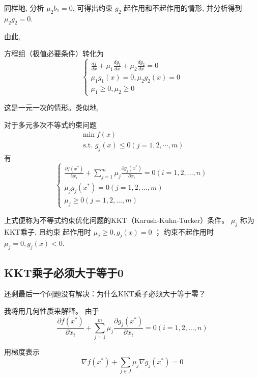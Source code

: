 同样地, 分析 $\mu_{2} b_{1}=0$, 可得出约束 $g_{2}$ 起作用和不起作用的情形, 并分析得到 $\mu_{2} g_{2}=0$.

由此, 
\begin{theorem}[一元一次优化式的KKT条件]
    方程组（极值必要条件）转化为
$$
\left\{\begin{array}{l}
\frac{d f}{d x}+\mu_{1} \frac{d g_{1}}{d x}+\mu_{2} \frac{d g_{2}}{d x}=0 \\
\mu_{1} g_{1}(x)=0, \mu_{2} g_{2}(x)=0 \\
\mu_{1} \geq 0, \mu_{2} \geq 0
\end{array}\right.
$$

\end{theorem}

 这是一元一次的情形。类似地, 

\begin{corollary}
    对于多元多次不等式约束问题
$$
\begin{array}{l}
\min f({x}) \\
\text { s.t. } g_{j}({x}) \leq 0(j=1,2, \cdots, m)
\end{array}
$$
有
$$
\left\{\begin{array}{l}
\frac{\partial f\left(x^{*}\right)}{\partial x_{i}}+\sum_{j=1}^{m} \mu_{j} \frac{\partial g_{j}\left(x^{*}\right)}{\partial x_{i}}=0(i=1,2, \ldots, n) \\
\mu_{j} g_{j}\left(x^{*}\right)=0(j=1,2, \ldots, m) \\
\mu_{j} \geq 0(j=1,2, \ldots, m)
\end{array}\right.
$$

上式便称为不等式约束优化问题的KKT（Karush-Kuhn-Tucker）条件。 $ \mu_{j} $ 称为KKT乘子, 且约束 起作用时 $ \mu_{j} \geq 0, g_{j}(x)=0 $ ； 约束不起作用时 $ \mu_{j}=0, g_{j}(x)<0 $.
\end{corollary}

\subsection{KKT乘子必须大于等于0}

\begin{problem}
    还剩最后一个问题没有解决：为什么KKT乘子必须大于等于零？
\end{problem}

我将用几何性质来解释。 由于
$$
\frac{\partial f\left(x^{*}\right)}{\partial x_{i}}+\sum_{j=1}^{m} \mu_{j} \frac{\partial g_{j}\left(x^{*}\right)}{\partial x_{i}}=0(i=1,2, \ldots, n)
$$

用梯度表示 $$ \nabla f\left({x}^{*}\right)+\sum_{j \in J} \mu_{j} \nabla g_{j}\left({x}^{*}\right)=0$$

